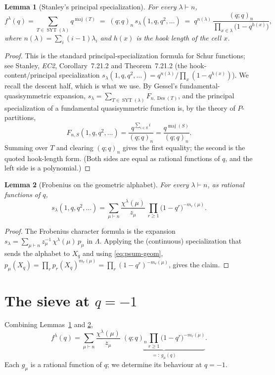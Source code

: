 \documentclass[11pt]{article}
\newtheorem{lemma}{Lemma}
\theoremstyle{definition}
\DeclareMathOperator{\Des}{Des}
\DeclareMathOperator{\maj}{maj}
\DeclareMathOperator{\SYT}{SYT}
\begin{document}
\begin{lemma}[Stanley's principal specialization]\label{lem:stanley}
For every $\lambda\vdash n$,
\[
   f^\lambda(q)=\sum_{T\in\SYT(\lambda)} q^{\maj(T)}
   \;=\;(q;q)_n\, s_\lambda(1,q,q^2,\dots)
   \;=\;q^{n(\lambda)}\,\frac{(q;q)_n}{\prod_{x\in\lambda}\bigl(1-q^{h(x)}\bigr)},
\]
where $n(\lambda)=\sum_i (i-1)\lambda_i$ and $h(x)$ is the hook length of the cell $x$.
\end{lemma}

\begin{proof}
This is the standard principal-specialization formula for Schur functions; see
Stanley, \emph{EC2}, Corollary~7.21.2 and Theorem~7.21.2 (the
hook-content/principal specialization $s_\lambda(1,q,q^2,\dots)
=q^{n(\lambda)}/\prod_{x}(1-q^{h(x)})$).  We recall the descent half, which is what
we use.  By Gessel's fundamental-quasisymmetric expansion,
$s_\lambda=\sum_{T\in\SYT(\lambda)} F_{n,\Des(T)}$, and the principal
specialization of a fundamental quasisymmetric function is, by the theory of
$P$-partitions,
\[
   F_{n,S}(1,q,q^2,\dots)=\frac{q^{\sum_{i\in S} i}}{(q;q)_n}
   =\frac{q^{\maj(S)}}{(q;q)_n}.
\]
Summing over $T$ and clearing $(q;q)_n$ gives the first equality; the second is the
quoted hook-length form.  (Both sides are equal as rational functions of $q$, and
the left side is a polynomial.)
\end{proof}

\begin{lemma}[Frobenius on the geometric alphabet]\label{lem:frob}
For every $\lambda\vdash n$, as rational functions of $q$,
\[
   s_\lambda(1,q,q^2,\dots)
   =\sum_{\mu\vdash n}\frac{\chi^\lambda(\mu)}{z_\mu}\,
     \prod_{r\ge1}\bigl(1-q^r\bigr)^{-m_r(\mu)}.
\]
\end{lemma}

\begin{proof}
The Frobenius character formula is the expansion
$s_\lambda=\sum_{\mu\vdash n} z_\mu^{-1}\,\chi^\lambda(\mu)\,p_\mu$ in $\Lambda$.
Applying the (continuous) specialization that sends the alphabet to $X_q$ and using
\eqref{eq:psum-geom},
$p_\mu(X_q)=\prod_r p_r(X_q)^{m_r(\mu)}=\prod_r (1-q^r)^{-m_r(\mu)}$, gives the claim.
\end{proof}

\section{The sieve at $q=-1$}

Combining Lemmas~\ref{lem:stanley} and \ref{lem:frob},
\begin{equation}\label{eq:combined}
   f^\lambda(q)
   =\sum_{\mu\vdash n}\frac{\chi^\lambda(\mu)}{z_\mu}\;
     \underbrace{(q;q)_n\prod_{r\ge1}\bigl(1-q^r\bigr)^{-m_r(\mu)}}_{=:~g_\mu(q)} .
\end{equation}
Each $g_\mu$ is a rational function of $q$; we determine its behaviour at $q=-1$.
\end{document}
